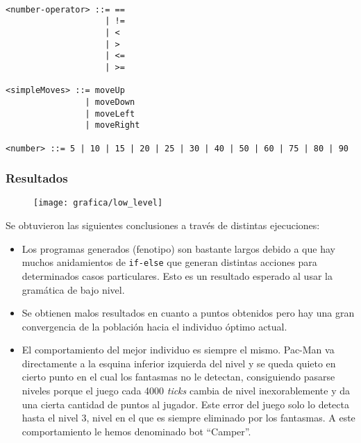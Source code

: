 \begin{lstlisting}[frame=single, breaklines=no, basicstyle=\fontsize{10}{11}\ttfamily, caption=Gramática de bajo nivel]
 
<number-operator> ::= ==
                    | !=
                    | <
                    | >
                    | <=
                    | >=
 
<simpleMoves> ::= moveUp
                | moveDown
                | moveLeft
                | moveRight
 
<number> ::= 5 | 10 | 15 | 20 | 25 | 30 | 40 | 50 | 60 | 75 | 80 | 90
\end{lstlisting}

\subsubsection{Resultados}
\begin{figure}[H]
\centering
\texttt{[image: grafica/low\_level]}
\end{figure}

Se obtuvieron las siguientes conclusiones a través de distintas ejecuciones:
\begin{itemize}
\item Los programas generados (fenotipo) son bastante largos debido a que hay muchos anidamientos de \texttt{if-else} que generan distintas acciones para determinados casos particulares. Esto es un resultado esperado al usar la gramática de bajo nivel.

\item Se obtienen malos resultados en cuanto a puntos obtenidos pero hay una gran convergencia de la población hacia el individuo óptimo actual.

\item El comportamiento del mejor individuo es siempre el mismo. Pac-Man va directamente a la esquina inferior izquierda del nivel y se queda quieto en cierto punto en el cual los fantasmas no le detectan, consiguiendo pasarse niveles porque el juego cada 4000 \textit{ticks} cambia de nivel inexorablemente y da una cierta cantidad de puntos al jugador. Este error del juego solo lo detecta hasta el nivel 3, nivel en el que es siempre eliminado por los fantasmas. A este comportamiento le hemos denominado bot ``Camper''.
\end{itemize}

